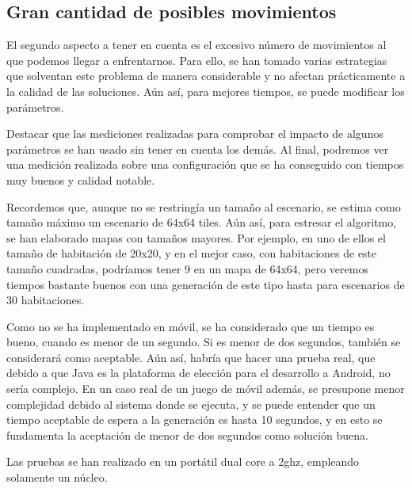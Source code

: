 \subsection{Gran cantidad de posibles movimientos}

El segundo aspecto a tener en cuenta es el excesivo número de movimientos al que podemos llegar a enfrentarnos. Para ello, se han tomado varias estrategias que solventan este problema de manera considerable y no afectan prácticamente a la calidad de las soluciones. Aún así, para mejores tiempos, se puede modificar los parámetros.

Destacar que las mediciones realizadas para comprobar el impacto de algunos parámetros se han usado sin tener en cuenta los demás. Al final, podremos ver una medición realizada sobre una configuración que se ha conseguido con tiempos muy buenos y calidad notable.

Recordemos que, aunque no se restringía un tamaño al escenario, se estima como tamaño máximo un escenario de 64x64 tiles. Aún así, para estresar el algoritmo, se han elaborado mapas con tamaños mayores. Por ejemplo, en uno de ellos el tamaño de habitación de 20x20, y en el mejor caso, con habitaciones de este tamaño cuadradas, podríamos tener 9 en un mapa de 64x64, pero veremos tiempos bastante buenos con una generación de este tipo hasta para escenarios de 30 habitaciones.

Como no se ha implementado en móvil, se ha considerado que un tiempo es bueno, cuando es menor de un segundo. Si es menor de dos segundos, también se considerará como aceptable. Aún así, habría que hacer una prueba real, que debido a que Java es la plataforma de elección para el desarrollo a Android, no sería complejo. En un caso real de un juego de móvil además, se presupone menor complejidad debido al sistema donde se ejecuta, y se puede entender que un tiempo aceptable de espera a la generación es hasta 10 segundos, y en esto se fundamenta la aceptación de menor de dos segundos como solución buena.

Las pruebas se han realizado en un portátil dual core a 2ghz, empleando solamente un núcleo.
